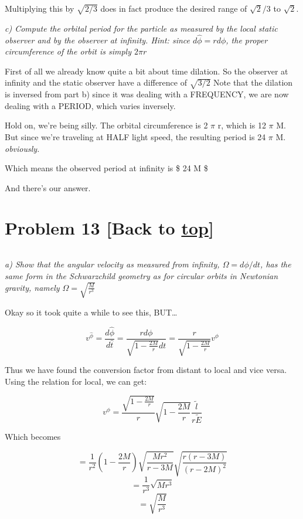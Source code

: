 \documentclass[landscape,letterpaper,10pt,english]{article}
\begin{document}
Multiplying this by \(\sqrt{2/3}\) does in fact produce the desired
range of \(\sqrt{2}/3\) to \(\sqrt{2}\).

    \emph{c) Compute the orbital period for the particle as measured by the
local static observer and by the observer at infinity. Hint: since
\(d\hat\phi = rd\phi\), the proper circumference of the orbit is simply
\(2\pi r\)}

    First of all we already know quite a bit about time dilation. So the
observer at infinity and the static observer have a difference of
\(\sqrt{3/2}\) Note that the dilation is inversed from part b) since it
was dealing with a FREQUENCY, we are now dealing with a PERIOD, which
varies inversely.

Hold on, we're being silly. The orbital circumference is 2 \(\pi\) r,
which is 12 \(\pi\) M. But since we're traveling at HALF light speed,
the resulting period is 24 \(\pi\) M. \emph{obviously.}

Which means the observed period at infinity is \$ 24 \pi M \$

And there's our answer.

    \hypertarget{problem-13-back-to-top}{%
\section{\texorpdfstring{Problem 13 {[}Back to
\hyperref[toc]{top}{]}}{Problem 13 {[}Back to {]}}}\label{problem-13-back-to-top}}

\[\label{P13}\]

\emph{a) Show that the angular velocity as measured from infinity,
\(\Omega = d\phi / dt\), has the same form in the Schwarzchild geometry
as for circular orbits in Newtonian gravity, namely
\(\Omega = \sqrt{\frac{M}{r^3}}\)}

    Okay so it took quite a while to see this, BUT\ldots{}

\[ v^\hat\phi = \frac{d\hat\phi}{d\hat t} = \frac{rd\phi}{\sqrt{1-\frac{2M}{r}} dt} = \frac{r}{\sqrt{1-\frac{2M}{r}}} v^\phi \]

    Thus we have found the conversion factor from distant to local and vice
versa. Using the relation for local, we can get:

\[ v^\phi = \frac{\sqrt{1-\frac{2M}{r}}}{r} \sqrt{1-\frac{2M}{r}} \frac{\tilde l}{r \tilde E} \]

Which becomes

\[ = \frac{1}{r^2} (1-\frac{2M}{r}) \sqrt{\frac{Mr^2}{r-3M}} \sqrt{\frac{r(r-3M)}{(r-2M)^2}} \]
\[ = \frac{1}{r^3}  \sqrt{Mr^3} \] \[ = \sqrt{\frac{M}{r^3}} \]
\end{document}
